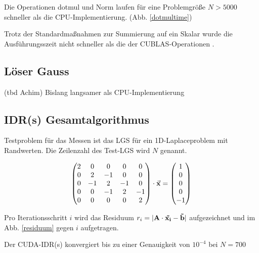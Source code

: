 \documentclass[journal]{IEEEtran}
\begin{document}
Die Operationen dotmul und Norm laufen für eine Problemgröße $N > 5000$ schneller
als die CPU-Implementierung. (Abb. \ref{dotmultime})

Trotz der Standardmaßnahmen \cite{reduction} zur Summierung auf ein Skalar wurde
die Ausführungsszeit nicht schneller als die der CUBLAS-Operationen \cite{cublas}.



\subsection{Löser Gauss}

(tbd Achim) Bislang langsamer als CPU-Implementierung

\subsection{IDR(s) Gesamtalgorithmus}

Testproblem für das Messen ist das LGS für ein 1D-Laplaceproblem mit Randwerten.
Die Zeilenzahl des Test-LGS wird $N$ genannt.

\begin{displaymath}
  \begin{pmatrix}
      2 &  0  &  0  & 0   & 0 \\
      0 &  2  & -1  & 0   & 0 \\
      0 & -1  &  2  & -1  & 0 \\
      0 &  0  &  -1  &  2 & -1 \\
      0 &  0  &  0   &  0 & 2  \\
  \end{pmatrix}
   \cdot \vec{ \bf{x} }
   =
  \begin{pmatrix} 1 \\ 0  \\ 0 \\ 0  \\ -1
  \end{pmatrix}
\end{displaymath}


Pro Iterationsschritt $i$ wird das Residuum $r_i = | \bf{A} \cdot \vec{\bf{x_i}} - \vec{b} |$ aufgezeichnet und
im Abb. \ref{residuum}  gegen $i$ aufgetragen.

Der CUDA-IDR(s) konvergiert bis zu einer Genauigkeit von $10^{-4}$ bei $N=700$
\end{document}

